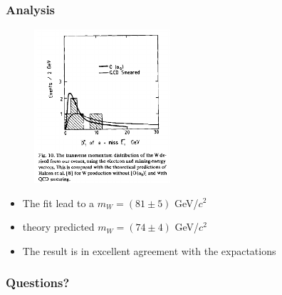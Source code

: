 \documentclass{beamer}
\begin{document}
\begin{frame}
  \frametitle{Analysis}
  \begin{figure}
    \includegraphics[width=0.45\textwidth]{result}
  \end{figure}
  \begin{itemize}
    \item The fit lead to a $m_W = (81 \pm 5)$ GeV/$c^2$
    \item theory predicted $m_W = (74 \pm 4)$ GeV/$c^2$
    \item The result is in excellent agreement with the expactations
  \end{itemize}
\end{frame}

\begin{frame}
\frametitle{Questions?}
\end{frame}



\end{document}
